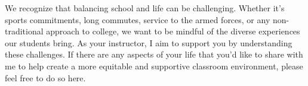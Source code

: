 \documentclass{ximera}
\author{Bart Snapp}
\begin{document}
\begin{question}
We recognize that balancing school and life can be challenging. Whether it's
sports commitments, long commutes, service to the armed forces, or any
non-traditional approach to college, we want to be mindful of the diverse
experiences our students bring. As your instructor, I aim to support you by
understanding these challenges. If there are any aspects of your life that
you'd like to share with me to help create a more equitable and supportive
classroom environment, please feel free to do so here.
\begin{freeResponse}
\end{freeResponse}
\end{question}
\end{document}
